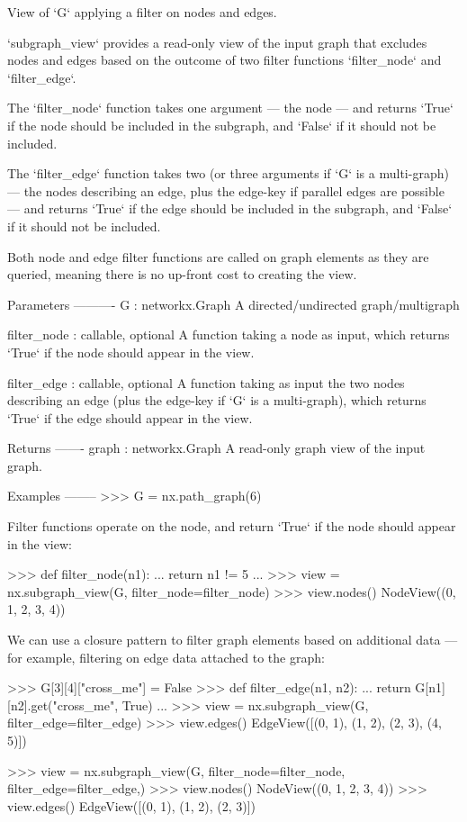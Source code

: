\begin{DoxyVerb}View of `G` applying a filter on nodes and edges.

`subgraph_view` provides a read-only view of the input graph that excludes
nodes and edges based on the outcome of two filter functions `filter_node`
and `filter_edge`.

The `filter_node` function takes one argument --- the node --- and returns
`True` if the node should be included in the subgraph, and `False` if it
should not be included.

The `filter_edge` function takes two (or three arguments if `G` is a
multi-graph) --- the nodes describing an edge, plus the edge-key if
parallel edges are possible --- and returns `True` if the edge should be
included in the subgraph, and `False` if it should not be included.

Both node and edge filter functions are called on graph elements as they
are queried, meaning there is no up-front cost to creating the view.

Parameters
----------
G : networkx.Graph
    A directed/undirected graph/multigraph

filter_node : callable, optional
    A function taking a node as input, which returns `True` if the node
    should appear in the view.

filter_edge : callable, optional
    A function taking as input the two nodes describing an edge (plus the
    edge-key if `G` is a multi-graph), which returns `True` if the edge
    should appear in the view.

Returns
-------
graph : networkx.Graph
    A read-only graph view of the input graph.

Examples
--------
>>> G = nx.path_graph(6)

Filter functions operate on the node, and return `True` if the node should
appear in the view:

>>> def filter_node(n1):
...     return n1 != 5
...
>>> view = nx.subgraph_view(G, filter_node=filter_node)
>>> view.nodes()
NodeView((0, 1, 2, 3, 4))

We can use a closure pattern to filter graph elements based on additional
data --- for example, filtering on edge data attached to the graph:

>>> G[3][4]["cross_me"] = False
>>> def filter_edge(n1, n2):
...     return G[n1][n2].get("cross_me", True)
...
>>> view = nx.subgraph_view(G, filter_edge=filter_edge)
>>> view.edges()
EdgeView([(0, 1), (1, 2), (2, 3), (4, 5)])

>>> view = nx.subgraph_view(G, filter_node=filter_node, filter_edge=filter_edge,)
>>> view.nodes()
NodeView((0, 1, 2, 3, 4))
>>> view.edges()
EdgeView([(0, 1), (1, 2), (2, 3)])
\end{DoxyVerb}
 